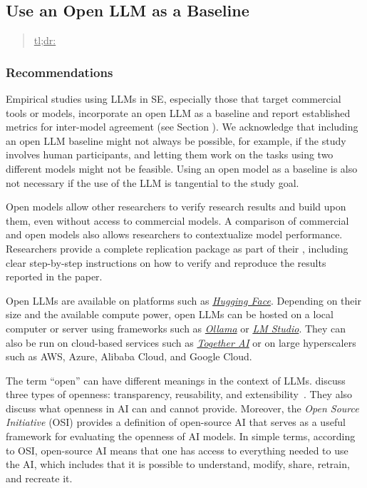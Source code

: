 



\subsection{Use an Open LLM as a Baseline}
\label{sec:use-an-open-llm-as-a-baseline}

\begin{quote}
\underline{tl;dr:} 
\end{quote}

\subsubsection{Recommendations}

Empirical studies using LLMs in SE, especially those that target commercial tools or models, \should incorporate an open LLM as a baseline and report established metrics for inter-model agreement (see Section \benchmarksmetrics).
We acknowledge that including an open LLM baseline might not always be possible, for example, if the study involves human participants, and letting them work on the tasks using two different models might not be feasible.
Using an open model as a baseline is also not necessary if the use of the LLM is tangential to the study goal. %

Open models allow other researchers to verify research results and build upon them, even without access to commercial models.
A comparison of commercial and open models also allows researchers to contextualize model performance.
Researchers \should provide a complete replication package as part of their \supplementarymaterial, including clear step-by-step instructions on how to verify and reproduce the results reported in the paper.

Open LLMs are available on platforms such as \href{https://huggingface.co/}{\emph{Hugging Face}}.
Depending on their size and the available compute power, open LLMs can be hosted on a local computer or server using frameworks such as \href{https://ollama.com/}{\emph{Ollama}} or \href{https://lmstudio.ai/}{\emph{LM Studio}}.
They can also be run on cloud-based services such as \href{https://together.ai/}{\emph{Together AI}} or on large hyperscalers such as AWS, Azure, Alibaba Cloud, and Google Cloud.

The term ``open'' can have different meanings in the context of LLMs.
\citeauthor{widder2024open} discuss three types of openness: transparency, reusability, and extensibility~\cite{widder2024open}.
They also discuss what openness in AI can and cannot provide.
Moreover, the \emph{Open Source Initiative} (OSI) \cite{OSIAI2024} provides a definition of open-source AI that serves as a useful framework for evaluating the openness of AI models.
In simple terms, according to OSI, open-source AI means that one has access to everything needed to use the AI, which includes that it is possible to understand, modify, share, retrain, and recreate it.

